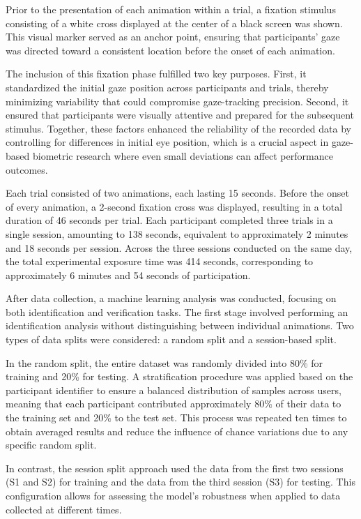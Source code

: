 \documentclass{article}
\begin{document}
Prior to the presentation of each animation within a trial, a fixation stimulus consisting of a white cross displayed at the center of a black screen was shown. 
This visual marker served as an anchor point, ensuring that participants’ gaze was directed toward a consistent location before the onset of each animation.

The inclusion of this fixation phase fulfilled two key purposes. 
First, it standardized the initial gaze position across participants and trials, thereby minimizing variability that could compromise gaze-tracking precision. 
Second, it ensured that participants were visually attentive and prepared for the subsequent stimulus. 
Together, these factors enhanced the reliability of the recorded data by controlling for differences in initial eye position, which is a crucial aspect in gaze-based biometric research where even small deviations can affect performance outcomes.

Each trial consisted of two animations, each lasting 15 seconds. 
Before the onset of every animation, a 2-second fixation cross was displayed, resulting in a total duration of 46 seconds per trial.
Each participant completed three trials in a single session, amounting to 138 seconds, equivalent to approximately 2 minutes and 18 seconds per session.
Across the three sessions conducted on the same day, the total experimental exposure time was 414 seconds, corresponding to approximately 6 minutes and 54 seconds of participation.

After data collection, a machine learning analysis was conducted, focusing on both identification and verification tasks.
The first stage involved performing an identification analysis without distinguishing between individual animations.
Two types of data splits were considered: a random split and a session-based split.

In the random split, the entire dataset was randomly divided into 80\% for training and 20\% for testing.
A stratification procedure was applied based on the participant identifier to ensure a balanced distribution of samples across users, meaning that each participant contributed approximately 80\% of their data to the training set and 20\% to the test set.
This process was repeated ten times to obtain averaged results and reduce the influence of chance variations due to any specific random split.

In contrast, the session split approach used the data from the first two sessions (S1 and S2) for training and the data from the third session (S3) for testing.
This configuration allows for assessing the model’s robustness when applied to data collected at different times.
\end{document}
